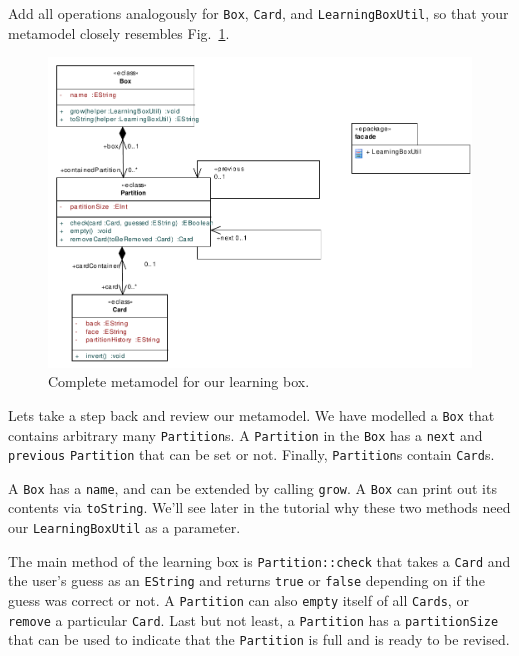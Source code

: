 Add all operations analogously for \texttt{Box}, \texttt{Card}, and
\texttt{LearningBoxUtil}, so that your metamodel closely resembles
Fig.~\ref{fig:metamodel_complete}. 
 
\begin{figure}[htbp]
	\centering 
  \includegraphics[width=\textwidth]{pics/memBoxBilder/memBox44} 
	\caption{Complete metamodel for our learning box.}
	\label{fig:metamodel_complete}
\end{figure}

Lets take a step back and review our metamodel.  We have modelled a \texttt{Box}
that contains arbitrary many \texttt{Partition}s.  A \texttt{Partition} in the
\texttt{Box} has a \texttt{next} and \texttt{previous} \texttt{Partition} that
can be set or not. Finally, \texttt{Partition}s contain \texttt{Card}s.

A \texttt{Box} has a \texttt{name}, and can be extended by calling
\texttt{grow}. A \texttt{Box} can print out its contents via \texttt{toString}. 
We'll see later in the tutorial why these two methods need our
\texttt{LearningBoxUtil} as a parameter.

The main method of the learning box is \texttt{Partition::check} that takes a
\texttt{Card} and the user's guess as an \texttt{EString} and returns
\texttt{true} or \texttt{false} depending on if the guess was correct or not.
A \texttt{Partition} can also \texttt{empty} itself of all \texttt{Cards}, or
\texttt{remove} a particular \texttt{Card}.  Last but not least, a
\texttt{Partition} has a \texttt{partitionSize} that can be used to indicate
that the \texttt{Partition} is full and is ready to be revised.

